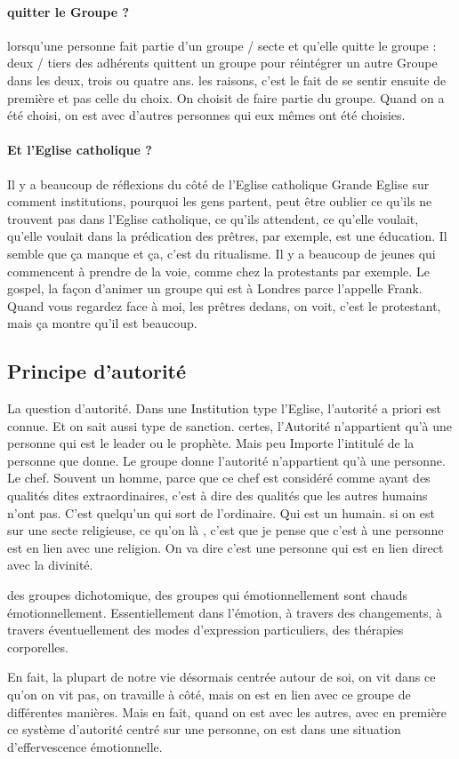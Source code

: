 \paragraph{quitter le Groupe ?}
lorsqu'une personne fait partie d'un groupe / secte et qu'elle quitte le groupe :  deux / tiers des adhérents quittent un groupe pour réintégrer un autre Groupe dans les deux, trois ou quatre ans.   les raisons,   c'est le fait de se sentir ensuite de première et pas celle du choix. On choisit de faire partie du groupe. Quand on a été choisi, on est avec d'autres personnes qui eux mêmes ont été choisies.  
 
 \paragraph{Et l'Eglise catholique ?}
 Il y a beaucoup de réflexions du côté de l'Eglise catholique Grande Eglise sur comment institutions, pourquoi les gens partent, peut être oublier ce qu'ils ne trouvent pas dans l'Eglise catholique, ce qu'ils attendent, ce qu'elle voulait, qu'elle voulait dans la prédication des prêtres, par exemple, est une éducation. Il semble que ça manque et ça, c'est du ritualisme.
  Il y a beaucoup de jeunes qui commencent à  prendre de la voie, comme chez la protestants par exemple. Le gospel, la façon d'animer un groupe qui est à  Londres parce l'appelle Frank. Quand vous regardez face à  moi, les prêtres dedans, on voit, c'est le protestant, mais ça montre qu'il est beaucoup.


  \subsection{Principe d'autorité}
  La question d'autorité. Dans une
Institution type l'Eglise, l'autorité a priori est connue. Et on sait aussi type de sanction. certes,  l'Autorité n'appartient qu'à  une personne qui est le leader ou le prophète. Mais peu Importe l'intitulé de la personne que donne.
Le groupe donne l'autorité n'appartient qu'à  une personne. Le chef. Souvent un homme, parce que ce chef est considéré comme ayant des qualités dites extraordinaires, c'est à  dire des qualités que les autres humains n'ont pas.
C'est quelqu'un qui sort de l'ordinaire.
Qui est un humain. si on est sur une secte religieuse, ce qu'on là , c'est que je pense que c'est à  une personne est en lien avec une religion. On va dire c'est une personne qui est en lien direct avec la divinité.

\begin{Def}
     des groupes dichotomique, des groupes qui émotionnellement sont chauds émotionnellement. Essentiellement dans l'émotion,  à travers des changements, à  travers éventuellement des modes d'expression particuliers, des thérapies corporelles. 
\end{Def}
 En fait, la plupart de notre vie désormais centrée autour de soi, on vit dans ce qu'on on vit pas, on travaille à  côté, mais on est en lien avec ce groupe de différentes manières. Mais en fait, quand on est avec les autres, avec en première ce système d'autorité centré sur une personne, on est dans une situation d'effervescence émotionnelle.


